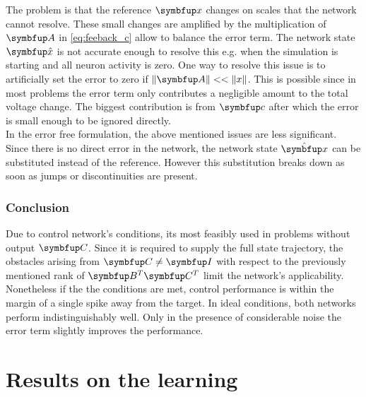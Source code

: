 The problem is that the reference $\bmu{x}$ changes on scales that the network cannot resolve. These small changes are amplified by the multiplication of $\bmu{A}$ in \cref{eq:feeback_c} allow to balance the error term. The network state $\bmu{\hat{x}}$ is not accurate enough to resolve this e.g. when the simulation is starting and all neuron activity is zero.
One way to resolve this issue is to artificially set the error to zero if $\|\bmu{A}\|<<\|x\|$. This is possible since in most problems the error term only contributes a negligible amount to the total voltage change. The biggest contribution is from $\bmu{c}$ after which the error is small enough to be ignored directly.\\
In the error free formulation, the above mentioned issues are less significant. Since there is no direct error in the network, the network state $\hat{\bmu{x}}$ can be substituted instead of the reference. However this substitution breaks down as soon as jumps or discontinuities are present.\\

\subsubsection{Conclusion}

Due to control network's conditions, its most feasibly used in problems without output $\bmu{C}$. Since it is required to supply the full state trajectory, the obstacles arising from $\bmu{C} \neq \bmu{I}$ with respect to the previously mentioned rank of $\bmu{B}^T\bmu{C}^T$ limit the network's applicability.\\
Nonetheless if the the conditions are met, control performance is within the margin of a single spike away from the target.
In ideal conditions, both networks perform indistinguishably well. Only in the presence of considerable noise the error term slightly improves the performance.

\section{Results on the learning}\label{sec:res_combined_learning}

